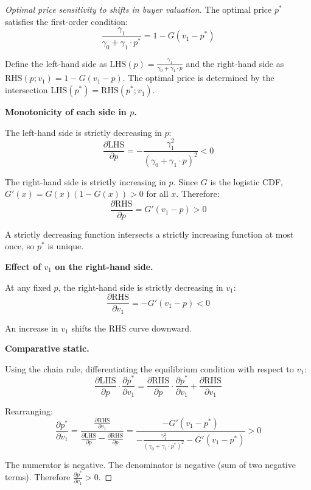 \documentclass[10pt,letterpaper]{bp-template-concise}
\begin{document}
\begin{proof}[Optimal price sensitivity to shifts in buyer valuation]

The optimal price $p^*$ satisfies the first-order condition:
\begin{equation}
    \frac{\gamma_1}{\gamma_0 + \gamma_1 \cdot p^*} = 1 - G(v_1 - p^*)
\end{equation}

Define the left-hand side as $\mathrm{LHS}(p) = \frac{\gamma_1}{\gamma_0 + \gamma_1 \cdot p}$ and the right-hand side as $\mathrm{RHS}(p; v_1) = 1 - G(v_1 - p)$. The optimal price is determined by the intersection $\mathrm{LHS}(p^*) = \mathrm{RHS}(p^*; v_1)$.

\textbf{Monotonicity of each side in $p$.}

The left-hand side is strictly decreasing in $p$:
\begin{equation}
    \frac{\partial \mathrm{LHS}}{\partial p} = -\frac{\gamma_1^2}{(\gamma_0 + \gamma_1 \cdot p)^2} < 0
\end{equation}

The right-hand side is strictly increasing in $p$. Since $G$ is the logistic CDF, $G'(x) = G(x)(1 - G(x)) > 0$ for all $x$. Therefore:
\begin{equation}
    \frac{\partial \mathrm{RHS}}{\partial p} = G'(v_1 - p) > 0
\end{equation}

A strictly decreasing function intersects a strictly increasing function at most once, so $p^*$ is unique.

\textbf{Effect of $v_1$ on the right-hand side.}

At any fixed $p$, the right-hand side is strictly decreasing in $v_1$:
\begin{equation}
    \frac{\partial \mathrm{RHS}}{\partial v_1} = -G'(v_1 - p) < 0
\end{equation}

An increase in $v_1$ shifts the RHS curve downward.

\textbf{Comparative static.}

Using the chain rule, differentiating the equilibrium condition with respect to $v_1$:
\begin{equation}
    \frac{\partial \mathrm{LHS}}{\partial p} \cdot \frac{\partial p^*}{\partial v_1} = \frac{\partial \mathrm{RHS}}{\partial p} \cdot \frac{\partial p^*}{\partial v_1} + \frac{\partial \mathrm{RHS}}{\partial v_1}
\end{equation}

Rearranging:
\begin{equation}
    \frac{\partial p^*}{\partial v_1} = \frac{\frac{\partial \mathrm{RHS}}{\partial v_1}}{\frac{\partial \mathrm{LHS}}{\partial p} - \frac{\partial \mathrm{RHS}}{\partial p}} = \frac{-G'(v_1 - p^*)}{-\frac{\gamma_1^2}{(\gamma_0 + \gamma_1 \cdot p^*)^2} - G'(v_1 - p^*)} > 0
\end{equation}

The numerator is negative. The denominator is negative (sum of two negative terms). Therefore $\frac{\partial p^*}{\partial v_1} > 0$.
\end{proof}
\end{document}
